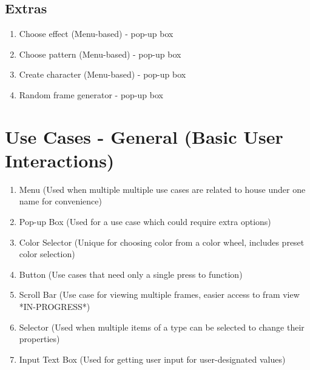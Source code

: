 \documentclass[12pt,a4paper]{article}
\begin{document}
\subsection*{Extras}

\begin{enumerate}
	\item Choose effect (Menu-based) - pop-up box
	\item Choose pattern (Menu-based) - pop-up box
	\item Create character (Menu-based) - pop-up box
	\item Random frame generator - pop-up box
\end{enumerate}

\section*{Use Cases - General (Basic User Interactions)}

\begin{enumerate}
	\item Menu (Used when multiple multiple use cases are related to house under one name for convenience)
	\item Pop-up Box (Used for a use case which could require extra options)
	\item Color Selector (Unique for choosing color from a color wheel, includes preset color selection)
	\item Button (Use cases that need only a single press to function)
	\item Scroll Bar (Use case for viewing multiple frames, easier access to fram view *IN-PROGRESS*)
	\item Selector (Used when multiple items of a type can be selected to change their properties)
	\item Input Text Box (Used for getting user input for user-designated values)
\end{enumerate}
\end{document}
